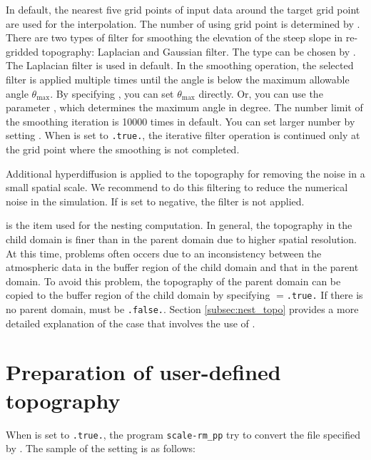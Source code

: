 In default, the nearest five grid points of input data around the target grid point are used for the interpolation. The number of using grid point is determined by .
There are two types of filter for smoothing the elevation of the steep slope in re-gridded topography: Laplacian and Gaussian filter.
The type can be chosen by . The Laplacian filter is used in default.
In the smoothing operation, the selected filter is applied multiple times until the angle is below the maximum allowable angle $\theta_{\max}$.
By specifying , you can set $\theta_{\max}$ directly. Or, you can use the parameter , which determines the maximum angle in degree.
The number limit of the smoothing iteration is 10000 times in default. You can set larger number by setting .
When  is set to \verb|.true.|, the iterative filter operation is continued only at the grid point where the smoothing is not completed.

Additional hyperdiffusion is applied to the topography for removing the noise in a small spatial scale. We recommend to do this filtering to reduce the numerical noise in the simulation.
If  is set to negative, the filter is not applied.

 is the item used for the nesting computation.
In general, the topography in the child domain is finer than in the parent domain due to higher spatial resolution.
At this time, problems often occers due to
an inconsistency between
the atmospheric data in the buffer region of the child domain and that in the parent domain.
To avoid this problem, the topography of the parent domain can be copied to the buffer region of the child domain by specifying $=$\verb|.true.| If there is no parent domain,  must be \verb|.false.|. Section \ref{subsec:nest_topo} provides a more detailed explanation of the case that involves the use of .



\section{Preparation of user-defined topography} \label{subsec:topo_userfile}

When  is set to \verb|.true.|, the program \verb|scale-rm_pp| try to convert the file specified by .
The sample of the setting is as follows:

